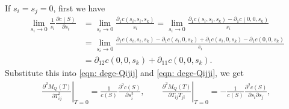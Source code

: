 \documentclass[10pt]{article}
\begin{document}
If $s_i=s_j=0$, first we have
\begin{align}
	\lim\limits_{s_i\to 0} \frac{1}{s_i} \frac{\partial c(S)}{\partial s_i} &= \lim\limits_{s_i\to 0} \frac{\partial_1 c(s_i,s_i,s_k)}{s_i} = \lim\limits_{s_i\to 0} \frac{\partial_1 c(s_i,s_i,s_k) - \partial_1 c(0,0,s_k)}{s_i} \nonumber \\
	&= \lim\limits_{s_i\to 0} \frac{\partial_1 c(s_i,s_i,s_k) - \partial_1 c(s_i,0,s_k) + \partial_1 c(s_i,0,s_k) - \partial_1 c(0,0,s_k)}{s_i} \nonumber \\
	&= \partial_{12} c(0,0,s_k) + \partial_{11} c(0,0,s_k).
\end{align}
Substitute this into \eqref{eqn: dege-Qijij} and \eqref{eqn: dege-Qijji}, we get
\begin{align}
	\left. \frac{\partial^2 M_Q(T)}{\partial T_{ij}^2} \right|_{T=0} = \frac{1}{c(S)} \frac{\partial^2 c(S)}{\partial s_i^2}, \qquad
	\left. \frac{\partial^2 M_Q(T)}{\partial T_{ij}T_{ji}} \right|_{T=0} = -\frac{1}{c(S)} \frac{\partial^2 c(S)}{\partial s_i \partial s_j},
\end{align}




\end{document}
